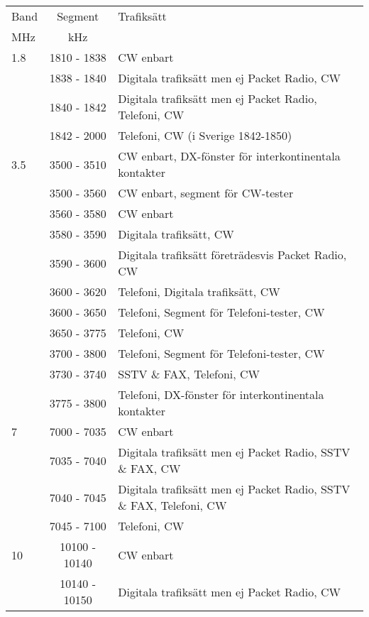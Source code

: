 \setlongtables
\begin{longtable}{lcl}
Band & Segment & Trafiksätt \\
MHz  & kHz     & \\ \hline
\endhead

1.8  & 1810 - 1838 & CW enbart \\
     & 1838 - 1840 & Digitala trafiksätt men ej Packet Radio, CW \\
     & 1840 - 1842 & Digitala trafiksätt men ej Packet Radio, Telefoni, CW \\
     & 1842 - 2000 & Telefoni, CW (i Sverige 1842-1850) \\

3.5  & 3500 - 3510 & CW enbart, DX-fönster för interkontinentala kontakter \\
     & 3500 - 3560 & CW enbart, segment för CW-tester \\
     & 3560 - 3580 & CW enbart \\
     & 3580 - 3590 & Digitala trafiksätt, CW \\
     & 3590 - 3600 & Digitala trafiksätt företrädesvis Packet Radio, CW \\
     & 3600 - 3620 & Telefoni, Digitala trafiksätt, CW \\
     & 3600 - 3650 & Telefoni, Segment för Telefoni-tester, CW \\
     & 3650 - 3775 & Telefoni, CW \\
     & 3700 - 3800 & Telefoni, Segment för Telefoni-tester, CW \\
     & 3730 - 3740 & SSTV \& FAX, Telefoni, CW \\
     & 3775 - 3800 & Telefoni, DX-fönster för interkontinentala kontakter \\

7    & 7000 - 7035 & CW enbart \\
     & 7035 - 7040 & Digitala trafiksätt men ej Packet Radio, SSTV \& FAX, CW \\
     & 7040 - 7045 & Digitala trafiksätt men ej Packet Radio, SSTV \& FAX, Telefoni, CW \\
     & 7045 - 7100 & Telefoni, CW \\

10   & 10100 - 10140 & CW enbart \\
     & 10140 - 10150 & Digitala trafiksätt men ej Packet Radio, CW \\


\end{longtable}
